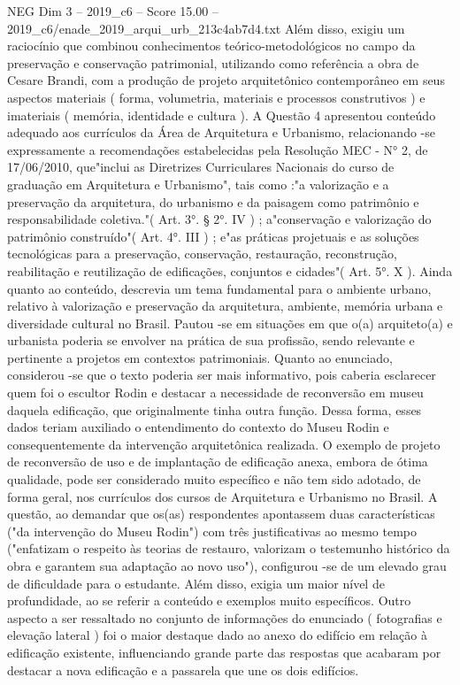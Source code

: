 \begin{textsample}{NEG Dim 3 – 2019\_c6 – Score 15.00 – 2019\_c6/enade\_2019\_arqui\_urb\_213c4ab7d4.txt}
Além disso, exigiu um raciocínio que combinou conhecimentos teórico-metodológicos no campo da preservação e conservação patrimonial, utilizando como referência a obra de Cesare Brandi, com a produção de projeto arquitetônico contemporâneo em seus aspectos materiais ( forma, volumetria, materiais e processos construtivos ) e imateriais ( memória, identidade e cultura ).
A Questão 4 apresentou conteúdo adequado aos currículos da Área de Arquitetura e Urbanismo, relacionando -se expressamente a recomendações estabelecidas pela Resolução MEC - N{\EmojiFont °} 2, de 17/06/2010, que"inclui as Diretrizes Curriculares Nacionais do curso de graduação em Arquitetura e Urbanismo", tais como :"a valorização e a preservação da arquitetura, do urbanismo e da paisagem como patrimônio e responsabilidade coletiva."( Art. 3{\EmojiFont °}. § 2{\EmojiFont °}.
IV ) ; a"conservação e valorização do patrimônio construído"( Art. 4{\EmojiFont °}.
III ) ; e"as práticas projetuais e as soluções tecnológicas para a preservação, conservação, restauração, reconstrução, reabilitação e reutilização de edificações, conjuntos e cidades"( Art. 5{\EmojiFont °}.
X ).
Ainda quanto ao conteúdo, descrevia um tema fundamental para o ambiente urbano, relativo à valorização e preservação da arquitetura, ambiente, memória urbana e diversidade cultural no Brasil.
Pautou -se em situações em que o(a) arquiteto(a) e urbanista poderia se envolver na prática de sua profissão, sendo relevante e pertinente a projetos em contextos patrimoniais.
Quanto ao enunciado, considerou -se que o texto poderia ser mais informativo, pois caberia esclarecer quem foi o escultor Rodin e destacar a necessidade de reconversão em museu daquela edificação, que originalmente tinha outra função.
Dessa forma, esses dados teriam auxiliado o entendimento do contexto do Museu Rodin e consequentemente da intervenção arquitetônica realizada.
O exemplo de projeto de reconversão de uso e de implantação de edificação anexa, embora de ótima qualidade, pode ser considerado muito específico e não tem sido adotado, de forma geral, nos currículos dos cursos de Arquitetura e Urbanismo no Brasil.
A questão, ao demandar que os(as) respondentes apontassem duas características ("da intervenção do Museu Rodin") com três justificativas ao mesmo tempo ("enfatizam o respeito às teorias de restauro, valorizam o testemunho histórico da obra e garantem sua adaptação ao novo uso"), configurou -se de um elevado grau de dificuldade para o estudante.
Além disso, exigia um maior nível de profundidade, ao se referir a conteúdo e exemplos muito específicos.
Outro aspecto a ser ressaltado no conjunto de informações do enunciado ( fotografias e elevação lateral ) foi o maior destaque dado ao anexo do edifício em relação à edificação existente, influenciando grande parte das respostas que acabaram por destacar a nova edificação e a passarela que une os dois edifícios.

\end{textsample}
